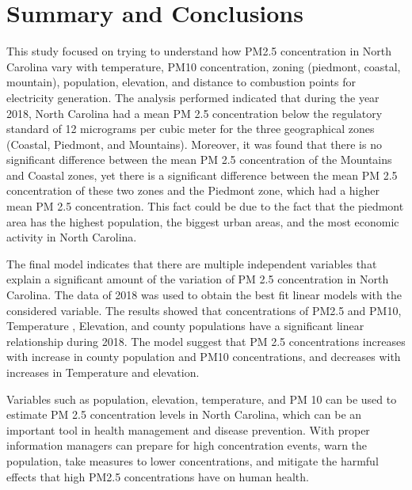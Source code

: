 \documentclass[12pt,]{article}
\begin{document}
\newpage

\section{Summary and Conclusions}\label{summary-and-conclusions}

This study focused on trying to understand how PM2.5 concentration in
North Carolina vary with temperature, PM10 concentration, zoning
(piedmont, coastal, mountain), population, elevation, and distance to
combustion points for electricity generation. The analysis performed
indicated that during the year 2018, North Carolina had a mean PM 2.5
concentration below the regulatory standard of 12 micrograms per cubic
meter for the three geographical zones (Coastal, Piedmont, and
Mountains). Moreover, it was found that there is no significant
difference between the mean PM 2.5 concentration of the Mountains and
Coastal zones, yet there is a significant difference between the mean PM
2.5 concentration of these two zones and the Piedmont zone, which had a
higher mean PM 2.5 concentration. This fact could be due to the fact
that the piedmont area has the highest population, the biggest urban
areas, and the most economic activity in North Carolina.

The final model indicates that there are multiple independent variables
that explain a significant amount of the variation of PM 2.5
concentration in North Carolina. The data of 2018 was used to obtain the
best fit linear models with the considered variable. The results showed
that concentrations of PM2.5 and PM10, Temperature , Elevation, and
county populations have a significant linear relationship during 2018.
The model suggest that PM 2.5 concentrations increases with increase in
county population and PM10 concentrations, and decreases with increases
in Temperature and elevation.

Variables such as population, elevation, temperature, and PM 10 can be
used to estimate PM 2.5 concentration levels in North Carolina, which
can be an important tool in health management and disease prevention.
With proper information managers can prepare for high concentration
events, warn the population, take measures to lower concentrations, and
mitigate the harmful effects that high PM2.5 concentrations have on
human health.
\end{document}
